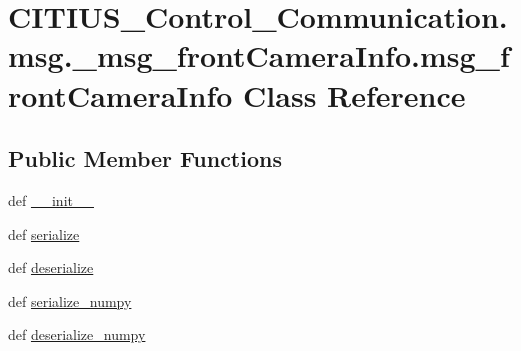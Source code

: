 \hypertarget{class_c_i_t_i_u_s___control___communication_1_1msg_1_1__msg__front_camera_info_1_1msg__front_camera_info}{\section{\-C\-I\-T\-I\-U\-S\-\_\-\-Control\-\_\-\-Communication.\-msg.\-\_\-msg\-\_\-front\-Camera\-Info.\-msg\-\_\-front\-Camera\-Info \-Class \-Reference}
\label{class_c_i_t_i_u_s___control___communication_1_1msg_1_1__msg__front_camera_info_1_1msg__front_camera_info}
}
\subsection*{\-Public \-Member \-Functions}
\begin{DoxyCompactItemize}
\item 
def \hyperlink{class_c_i_t_i_u_s___control___communication_1_1msg_1_1__msg__front_camera_info_1_1msg__front_camera_info_a58684218fe1973e901787eac7c32d662}{\-\_\-\-\_\-init\-\_\-\-\_\-}
\item 
def \hyperlink{class_c_i_t_i_u_s___control___communication_1_1msg_1_1__msg__front_camera_info_1_1msg__front_camera_info_aba77a0f411b5b2cba11867fe098e28f8}{serialize}
\item 
def \hyperlink{class_c_i_t_i_u_s___control___communication_1_1msg_1_1__msg__front_camera_info_1_1msg__front_camera_info_a8339b83852faae1428d2750fb37cd3b0}{deserialize}
\item 
def \hyperlink{class_c_i_t_i_u_s___control___communication_1_1msg_1_1__msg__front_camera_info_1_1msg__front_camera_info_a6153383b705c1909cb451d056ade1d55}{serialize\-\_\-numpy}
\item 
def \hyperlink{class_c_i_t_i_u_s___control___communication_1_1msg_1_1__msg__front_camera_info_1_1msg__front_camera_info_a29806b17bbe5709b49a4022668975280}{deserialize\-\_\-numpy}
\end{DoxyCompactItemize}
